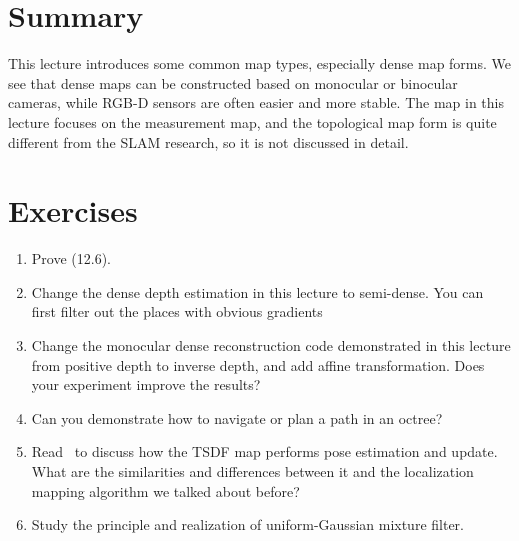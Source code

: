 \section{Summary}
This lecture introduces some common map types, especially dense map forms. We see that dense maps can be constructed based on monocular or binocular cameras, while RGB-D sensors are often easier and more stable. The map in this lecture focuses on the measurement map, and the topological map form is quite different from the SLAM research, so it is not discussed in detail.

\section*{Exercises}
\begin{enumerate}
	\item Prove (12.6).
	\item Change the dense depth estimation in this lecture to semi-dense. You can first filter out the places with obvious gradients
	\item[\optional] Change the monocular dense reconstruction code demonstrated in this lecture from positive depth to inverse depth, and add affine transformation. Does your experiment improve the results?
	\item Can you demonstrate how to navigate or plan a path in an octree?
	\item Read~\cite{Newcombe2011} to discuss how the TSDF map performs pose estimation and update. What are the similarities and differences between it and the localization mapping algorithm we talked about before?
	\item[\optional] Study the principle and realization of uniform-Gaussian mixture filter.
\end{enumerate}
